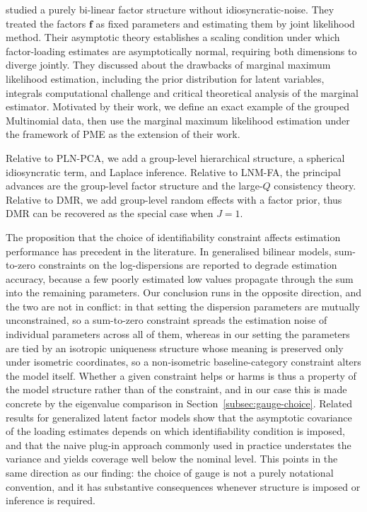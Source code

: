\citet{Cui2026} studied a purely bi-linear factor structure without idiosyncratic-noise. They treated the factors $\mathbf{f}$ as fixed parameters and estimating them by joint likelihood method. Their asymptotic theory establishes a scaling condition under which factor-loading estimates are asymptotically normal, requiring both dimensions to diverge jointly. They discussed about the drawbacks of marginal maximum likelihood estimation, including the prior distribution for latent variables, integrals computational challenge and critical theoretical analysis of the marginal estimator. Motivated by their work, we define an exact example of the grouped Multinomial data, then use the marginal maximum likelihood estimation under the framework of PME as the extension of their work.

Relative to PLN-PCA, we add a group-level hierarchical structure, a spherical idiosyncratic term, and Laplace inference. Relative to LNM-FA, the principal advances are the group-level factor structure and the large-$Q$ consistency theory. Relative to DMR, we add group-level random effects with a factor prior, thus DMR can be recovered as the special case when $J = 1$.

The proposition that the choice of identifiability constraint affects estimation performance has precedent in the literature. In generalised bilinear models, sum-to-zero constraints on the log-dispersions are reported to degrade estimation accuracy, because a few poorly estimated low values propagate through the sum into the remaining parameters. Our conclusion runs in the opposite direction, and the two are not in conflict: in that setting the dispersion parameters are mutually unconstrained, so a sum-to-zero constraint spreads the estimation noise of individual parameters across all of them, whereas in our setting the parameters are tied by an isotropic uniqueness structure whose meaning is preserved only under isometric coordinates, so a non-isometric baseline-category constraint alters the model itself. Whether a given constraint helps or harms is thus a property of the model structure rather than of the constraint, and in our case this is made concrete by the eigenvalue comparison in Section~\ref{subsec:gauge-choice}. Related results for generalized latent factor models show that the asymptotic covariance of the loading estimates depends on which identifiability condition is imposed, and that the naive plug-in approach commonly used in practice understates the variance and yields coverage well below the nominal level. This points in the same direction as our finding: the choice of gauge is not a purely notational convention, and it has substantive consequences whenever structure is imposed or inference is required.

